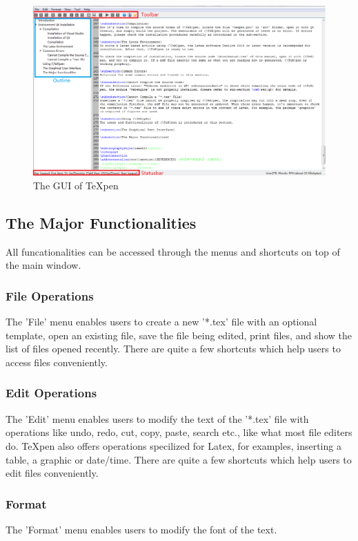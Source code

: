 \documentclass[12pt,a4paper]{article}
\begin{document}
\begin{figure}[hbt]
\begin{center}
\includegraphics[scale=0.47]{figs/GUI.png}
\end{center}
\caption{The GUI of {\TeX}pen}
\label{gui}
\end{figure}


\subsection{The Major Functionalities}
All funcationalities can be accessed through the menus and shortcuts on top of the main window.

\subsubsection{File Operations}
The 'File' menu enables users to create a new '*.tex' file with an optional template, open an existing file, save the file being edited, print files, and show the list of files opened recently. There are quite a few shortcuts which help users to access files conveniently.

\subsubsection{Edit Operations}
The 'Edit' menu enables users to modify the text of the '*.tex' file with operations like undo, redo, cut, copy, paste, search etc., like what most file editers do. {\TeX}pen also offers operations specilized for Latex, for examples, inserting a table, a graphic or date/time. There are quite a few shortcuts which help users to edit files conveniently.

\subsubsection{Format}
The 'Format' menu enables users to modify the font of the text.
\end{document}
